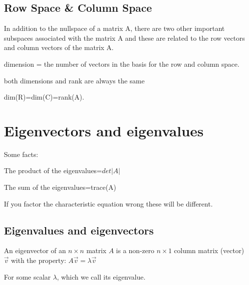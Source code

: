 \documentclass{extarticle}
\begin{document}
\begin{multicols}{4}
\begin{tcolorbox}[enhanced jigsaw,sharp corners,coltext=black,colback=BurntOrange!25!white,boxrule=0pt,breakable,size=minimal]
\end{tcolorbox}

\begin{tcolorbox}[enhanced jigsaw,sharp corners,coltext=black,colback=BurntOrange!25!white,boxrule=0pt,breakable,size=minimal]

\subsection{Row Space \& Column Space}
In addition to the nullspace of a matrix A, there are two other important subspaces associated with the matrix A and these are related to the row vectors and column vectors of the matrix A.



dimension = the number of vectors in the basis for the row and column space.

both dimensions and rank are always the same

dim(R)=dim(C)=rank(A).\end{tcolorbox}

























\section{Eigenvectors and eigenvalues}
Some facts:

	The product of the eigenvalues=$det|A|$
	
	The sum of the eigenvalues=trace(A)
	
If you factor the characteristic equation wrong these will be different.


\subsection{Eigenvalues and eigenvectors}

An eigenvector of an $n\times n$ matrix $A$ is a non-zero $n\times 1$ column matrix (vector) $\vec{v}$ with the property:
$A\vec{v}=\lambda\vec{v}$

For some scalar $\lambda$, which we call its eigenvalue.


\end{multicols}
\end{document}
